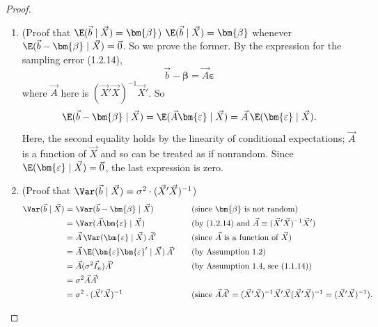 \begin{proof}
\begin{enumerate}[label=(\alph*)]

\item (Proof that $\E(\vec{b} \mid \vec{X}) = \bm{\beta}$)\quad
  $\E(\vec{b} \mid \vec{X}) = \bm{\beta}$ whenever
  $\E(\vec{b} - \bm{\beta} \mid \vec{X}) = \vec{0}$.  So we prove the former.  By the
  expression for the sampling error (1.2.14),
  \[
    \vec{b} - \bm{\beta} = \vec{A}\bm{\varepsilon}
  \]
  where $\vec{A}$ here is $(\vec{X}'\vec{X})^{-1}\vec{X}'$.  So
  \[
    \E(\vec{b} - \bm{\beta} \mid \vec{X})
      = \E(\vec{A}\bm{\varepsilon} \mid \vec{X})
      = \vec{A}\,\E(\bm{\varepsilon} \mid \vec{X}).
  \]
  Here, the second equality holds by the linearity of conditional expectations;
  $\vec{A}$ is a function of $\vec{X}$ and so can be treated as if nonrandom.  Since
  $\E(\bm{\varepsilon} \mid \vec{X}) = \vec{0}$, the last expression is zero.

\item (Proof that $\Var(\vec{b} \mid \vec{X}) = \sigma^{2} \cdot (\vec{X}'\vec{X})^{-1}$)
  \begin{align*}
    \Var(\vec{b} \mid \vec{X})
      &= \Var(\vec{b} - \bm{\beta} \mid \vec{X})
        &\quad&\text{(since $\bm{\beta}$ is not random)} \\
      &= \Var(\vec{A}\bm{\varepsilon} \mid \vec{X})
        &&\text{(by (1.2.14) and $\vec{A} \equiv (\vec{X}'\vec{X})^{-1}\vec{X}'$)} \\
      &= \vec{A}\,\Var(\bm{\varepsilon} \mid \vec{X})\,\vec{A}'
        &&\text{(since $\vec{A}$ is a function of $\vec{X}$)} \\
      &= \vec{A}\,\E(\bm{\varepsilon}\bm{\varepsilon}' \mid \vec{X})\,\vec{A}'
        &&\text{(by Assumption 1.2)} \\
      &= \vec{A}(\sigma^{2}\vec{I}_{n})\vec{A}'
        &&\text{(by Assumption 1.4, see (1.1.14))} \\
      &= \sigma^{2}\vec{A}\vec{A}' \\
      &= \sigma^{2} \cdot (\vec{X}'\vec{X})^{-1}
        &&\text{(since $\vec{A}\vec{A}' = (\vec{X}'\vec{X})^{-1}\vec{X}'\vec{X}(\vec{X}'\vec{X})^{-1} = (\vec{X}'\vec{X})^{-1}$).}
  \end{align*}


\end{enumerate}
\end{proof}

